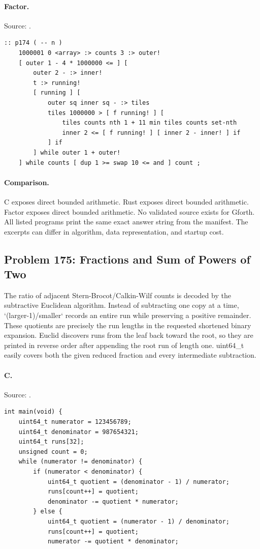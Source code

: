 \paragraph{Factor.} Source: .
\begin{lstlisting}
:: p174 ( -- n )
    1000001 0 <array> :> counts 3 :> outer!
    [ outer 1 - 4 * 1000000 <= ] [
        outer 2 - :> inner!
        t :> running!
        [ running ] [
            outer sq inner sq - :> tiles
            tiles 1000000 > [ f running! ] [
                tiles counts nth 1 + 11 min tiles counts set-nth
                inner 2 <= [ f running! ] [ inner 2 - inner! ] if
            ] if
        ] while outer 1 + outer!
    ] while counts [ dup 1 >= swap 10 <= and ] count ;
\end{lstlisting}

\paragraph{Comparison.}
C exposes direct bounded arithmetic. Rust exposes direct bounded arithmetic. Factor exposes direct bounded arithmetic.
No validated source exists for Gforth.
All listed programs print the same exact answer string from the manifest. The excerpts can differ in algorithm, data representation, and startup cost.

\subsection{Problem 175: Fractions and Sum of Powers of Two}
\label{walkthrough:p175}
The ratio of adjacent Stern-Brocot/Calkin-Wilf counts is decoded by the subtractive Euclidean algorithm. Instead of subtracting one copy at a time, `(larger-1)/smaller` records an entire run while preserving a positive remainder. These quotients are precisely the run lengths in the requested shortened binary expansion. Euclid discovers runs from the leaf back toward the root, so they are printed in reverse order after appending the root run of length one. uint64\_t easily covers both the given reduced fraction and every intermediate subtraction.

\paragraph{C.} Source: .
\begin{lstlisting}
int main(void) {
    uint64_t numerator = 123456789;
    uint64_t denominator = 987654321;
    uint64_t runs[32];
    unsigned count = 0;
    while (numerator != denominator) {
        if (numerator < denominator) {
            uint64_t quotient = (denominator - 1) / numerator;
            runs[count++] = quotient;
            denominator -= quotient * numerator;
        } else {
            uint64_t quotient = (numerator - 1) / denominator;
            runs[count++] = quotient;
            numerator -= quotient * denominator;
\end{lstlisting}

